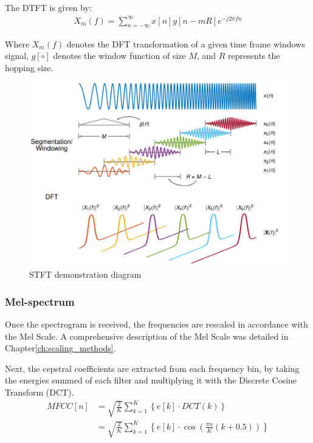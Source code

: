 The DTFT is given by:
\begin{align}
    X_{m}(f) = \sum_{n=-\infty}^{\infty} x[n]g[n-mR]e^{-j2\pi fn}
\end{align}

Where \(X_{m}(f)\) denotes the DFT transformation of
a given time frame windows signal,
\(g[\circ]\) denotes the window function of size \(M\),
and \(R\) represents the hopping size.

\begin{figure}[H]
    \centering
    \includegraphics[width=\linewidth]{Features/images/iscola_stft}
    \caption{STFT demonstration diagram}\label{fig:iscola_stft}
\end{figure}

\subsubsection{Mel-spectrum}
Once the spectrogram is received, 
the frequencies are rescaled in accordance with the Mel Scale.
A comprehensive description of the Mel Scale 
was detailed in Chapter\;\ref{ch:scaling_methods}.

Next, the cepstral coefficients are extracted from each frequency bin, 
by taking the energies summed of each filter and multiplying it
with the Discrete Cosine Transform (DCT).
\begin{align}\label{eq:mfcc}
    MFCC[n] & = \sqrt{\frac{2}{K}} \sum_{k=1}^{K} \left\{ 
        e[k] \cdot DCT\left( k \right)
     \right\} \nonumber \\
     & = \sqrt{\frac{2}{K}} \sum_{k=1}^{K} \left\{ 
        e[k] \cdot \cos \left( \frac{\pi n}{K} (k+0.5) \right)
     \right\}
\end{align}

